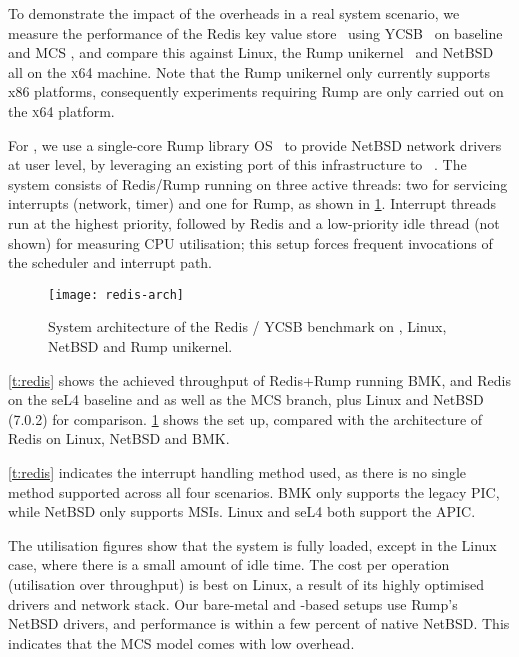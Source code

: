 To demonstrate the impact of the overheads in a real system scenario, 
we measure the performance of the Redis key value store~\citep{redis:url} using 
\gls{YCSB}~\citep{Cooper_STRS_10} on baseline and MCS \selfour, and compare this
against Linux, the Rump unikernel~\citep{Kantee_Cormack_14} and 
NetBSD~\citep*{NetBSD:url} all on the \textsc{x64} machine. Note that the Rump unikernel only
currently supports x86 platforms, consequently experiments requiring Rump are only carried out on
the \textsc{x64} platform. 

For \selfour, we use a single-core Rump library OS~\citep{Kantee_Cormack_14} to provide 
NetBSD network drivers at user level, by leveraging an existing port of this infrastructure
to \selfour~\citep{McLeod:be}.
The system consists of Redis/Rump running on three active \selfour threads: 
two for servicing interrupts (network, timer) and one for Rump, as shown in
\cref{f:redis-arch}. Interrupt threads run at the highest priority,
followed by Redis and a low-priority idle thread (not shown) for measuring CPU utilisation;
this setup forces frequent invocations of the scheduler and interrupt path.

 \begin{figure}[ht]
    \centering
    \texttt{[image: redis-arch]}
    \caption[System architecture of Redis benchmark.]{System architecture of the Redis / \gls{YCSB} benchmark on \selfour, 
        Linux, NetBSD and Rump unikernel.}
    \label{f:redis-arch}
\end{figure}

\cref{t:redis} shows the achieved throughput of Redis+Rump
running \gls{BMK}, and Redis on the seL4 baseline and as well as the MCS
branch, plus Linux and NetBSD (7.0.2) for comparison. \cref{f:redis-arch} shows the \selfour set up,
compared with the architecture of Redis on Linux, NetBSD and \gls{BMK}. 

\cref{t:redis} indicates the interrupt handling method used, as there is no single method supported
across all four scenarios. \gls{BMK} only supports the legacy
\gls{PIC},
while NetBSD only supports \glspl{MSI}. Linux and seL4 both support the
\gls{APIC}.

The utilisation figures show that the system is fully loaded, except
in the Linux case, where there is a small amount of idle time. The
cost per operation (utilisation over throughput) is best on Linux, a
result of its highly optimised drivers and network stack. Our
bare-metal and \selfour-based setups use Rump's NetBSD drivers, and
 performance is within a few percent of native NetBSD. This
indicates that the MCS model comes with low overhead.

